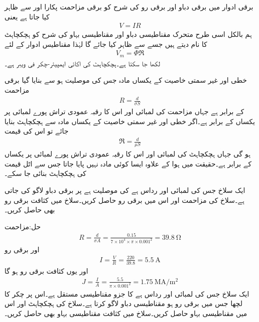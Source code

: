 برقی ادوار میں برقی دباو اور برقی رو کی شرح کو برقی مزاحمت پکارا اور  سے ظاہر کیا جاتا ہے یعنی
\begin{align}
V=I R
\end{align}
 ہم بالکل اسی طرح متحرک مقناطیسی دباو اور مقناطیسی بہاو کی شرح کو ہچکچاہٹ کا نام دیتے ہیں جسے  سے ظاہر کیا جائے گا لہٰذا مقناطیس ادوار کے لئے
\begin{align}
V_m=\Phi \Re
\end{align}
لکھا جا سکتا ہے۔ہچکچاہٹ کی اکائی ایمپیئر-چکر فی ویبر  ہے۔

خطی اور غیر سمتی خاصیت کے  یکساں مادہ جس کی موصلیت  ہو سے بنایا گیا برقی مزاحمت
\begin{align}
R=\frac{d}{\sigma S}
\end{align}
کے برابر ہے جہاں مزاحمت کی لمبائی  اور اس کا رقبہ عمودی تراش پورے لمبائی پر یکساں  کے برابر ہے۔اگر خطی اور غیر سمتی خاصیت کے یکساں مادہ سے ہچکچاہٹ بنایا جائے تو اس کی قیمت
\begin{align}
\Re=\frac{d}{\mu S}
\end{align}
ہو گی جہاں ہچکچاہٹ کی لمبائی  اور اس کا رقبہ عمودی تراش پورے لمبائی پر یکساں  کے برابر ہے۔حقیقت میں ہوا کے علاوہ ایسا کوئی مادہ نہیں پایا جاتا جس سے اٹل قیمت کی ہچکچاہٹ بنائی جا سکے۔

ایک سلاخ جس کی لمبائی  اور رداس  ہے کی موصلیت  ہے پر  برقی دباو لاگو کی جاتی ہے۔سلاخ کی مزاحمت اور اس میں برقی رو حاصل کریں۔سلاخ میں کثافت برقی رو بھی حاصل کریں۔

حل:مزاحمت
\begin{align*}
R=\frac{d}{\sigma A}=\frac{0.15}{7 \times 10^4 \times \pi \times 0.001^2}=\SI{39.8}{\ohm}
\end{align*}
اور برقی رو
\begin{align*}
I=\frac{V}{R}=\frac{220}{39.8}=\SI{5.5}{\ampere}
\end{align*}
اور یوں کثافت برقی رو ہو گا
\begin{align*}
J=\frac{I}{A}=\frac{5.5}{\pi\times 0.001^2}=\SI{1.75}{\mega \ampere \per \meter \squared}
\end{align*}
ایک سلاخ جس کی لمبائی  اور رداس  ہے کا جزو مقناطیسی مستقل  ہے۔اس پر  چکر کا لچھا جس میں  برقی رو ہو مقناطیسی دباو لاگو کرتا ہے۔سلاخ کی ہچکچاہٹ اور اس میں مقناطیسی بہاو حاصل کریں۔سلاخ میں کثافت مقناطیسی بہاو بھی حاصل کریں۔

